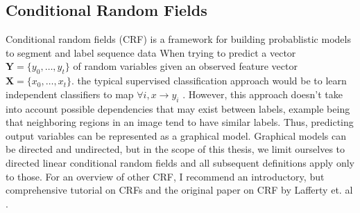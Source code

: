 \subsection{Conditional Random Fields}
\label{sec:crf}

Conditional random fields (CRF) is a framework for building probablistic 
models to segment and label sequence data \citep{wallach2004conditional}
When trying to predict a vector $\mathbf{Y} = \{y_0, \dots, y_t\}$
of random variables given an observed feature vector 
$\mathbf{X} = \{x_0, \dots, x_t\}$. 
the typical supervised classification approach would be 
to learn independent classifiers to map $\forall i,  x \to y_i$
\citep{sutton2012introduction}.
However, this approach doesn't take into account possible dependencies
that may exist between labels, example being that neighboring 
regions in an image tend to have similar labels. 
Thus, predicting output variables can be represented as a graphical model.
Graphical models can be directed and undirected, but 
in the scope of this thesis, we limit ourselves to 
directed linear conditional random fields
and all subsequent definitions apply only to those. 
For an overview of other CRF, I recommend an
introductory, but comprehensive tutorial 
on CRFs \citep{sutton2012introduction} and the original paper on CRF by Lafferty et. al
\citep{lafferty2001conditional}. 

